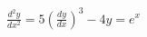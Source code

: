 \documentclass[preview]{standalone}
\begin{document}
\begin{align*}
\frac{d^2y}{dx^2} = 5\left( \frac{dy}{dx} \right)^3 -4y = e^x
\end{align*}
\end{document}
